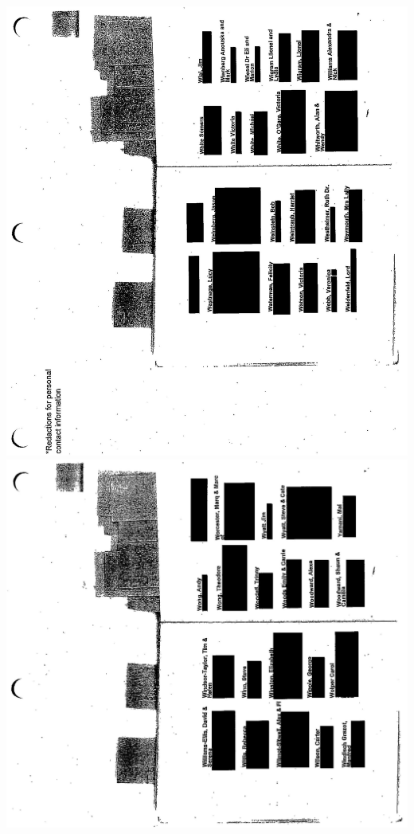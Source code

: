 \documentclass[10pt]{article}
\begin{document}
\includegraphics[max width=\textwidth, center]{2025_02_27_dd68c3d38de88f0516d9g-179}\\
\includegraphics[max width=\textwidth, center]{2025_02_27_dd68c3d38de88f0516d9g-180}
\end{document}
